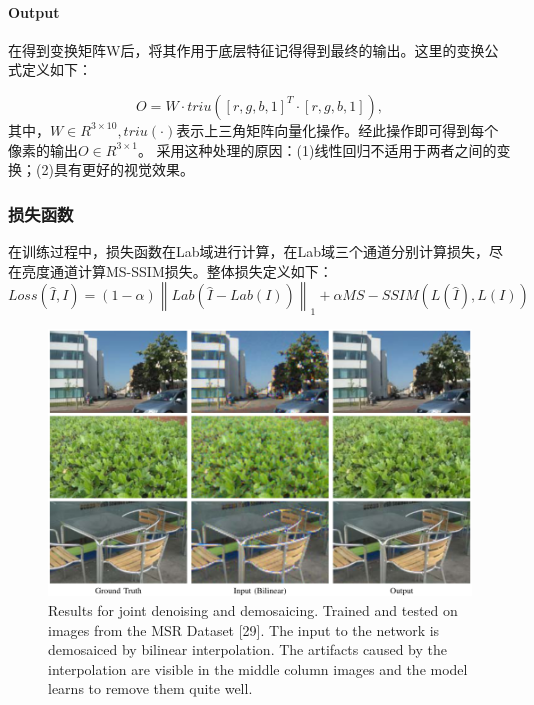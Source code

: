 \documentclass[letterpaper,12pt]{article}
\begin{document}
			\paragraph{Output}	\qquad
			
			在得到变换矩阵W后，将其作用于底层特征记得得到最终的输出。这里的变换公式定义如下：
			
			\begin{equation}
				\label{eq:Transform} %
				O=W \cdot triu(\left[r,g,b,1\right]^T \cdot \left[r,g,b,1\right]),
			\end{equation}
			其中，$W\in R^{3\times10} , triu\left(\cdot\right)$表示上三角矩阵向量化操作。经此操作即可得到每个像素的输出$O\in R^{3\times1}$。
			采用这种处理的原因：(1)线性回归不适用于两者之间的变换；(2)具有更好的视觉效果。
		
		\subsubsection{损失函数}
		
		在训练过程中，损失函数在Lab域进行计算，在Lab域三个通道分别计算损失，尽在亮度通道计算MS-SSIM损失。整体损失定义如下：
		\begin{equation}
			\label{eq:DeepISP loss function} %
			Loss\left(\hat{I},I\right)=\left(1-\alpha\right){\left \| Lab \left( \hat{I} -Lab(I)\right) \right \|}_1+ \alpha MS-SSIM(L(\hat{I}),L(I))
		\end{equation}
		
		\begin{figure}[ht] 
			\centering
			\includegraphics[width=0.3\columnwidth]{Results_for_joint_denoising_and_demosaicing}
			\captionsetup{font=scriptsize}
			\caption{
				\label{fig: Results for joint denoising and demosaicinge DeepISP} 
				Results for joint denoising and demosaicing. Trained and tested on images from the MSR Dataset [29]. The input to the network is demosaiced by bilinear interpolation. The artifacts caused by the interpolation are visible in the middle column images and the model learns to remove them quite well.}
		\end{figure}
	
\end{document}
